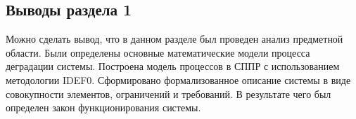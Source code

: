\subsection*{Выводы раздела 1}

Можно сделать вывод, что в данном разделе был проведен анализ предметной области. 
Были определены основные математические модели процесса деградации системы. 
Построена модель процессов в СППР с использованием методологии IDEF0. 
Сформировано формализованное описание системы в виде совокупности элементов, ограничений и требований. 
В результате чего был определен закон функционирования системы.






